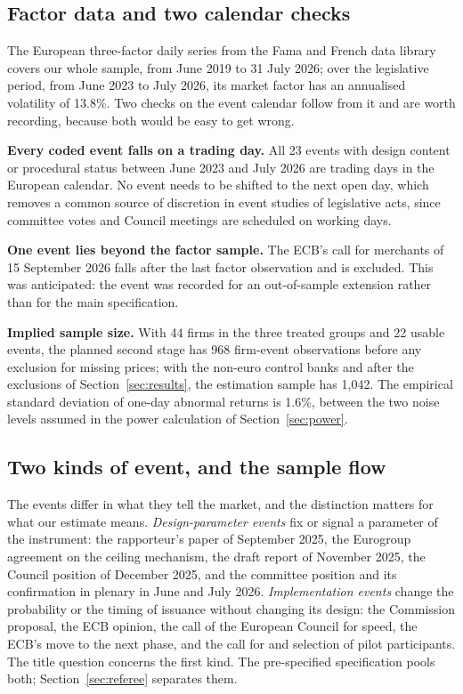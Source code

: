 \documentclass[11pt]{article}
\theoremstyle{plain}\newtheorem{proposition}{Proposition}
\begin{document}
\subsection{Factor data and two calendar checks}

The European three-factor daily series from the Fama and French data library covers our whole sample, from June 2019 to 31 July 2026; over the legislative period, from June 2023 to July 2026, its market factor has an annualised volatility of 13.8\%. Two checks on the event calendar follow from it and are worth recording, because both would be easy to get wrong.

\textbf{Every coded event falls on a trading day.} All 23 events with design content or procedural status between June 2023 and July 2026 are trading days in the European calendar. No event needs to be shifted to the next open day, which removes a common source of discretion in event studies of legislative acts, since committee votes and Council meetings are scheduled on working days.

\textbf{One event lies beyond the factor sample.} The ECB's call for merchants of 15 September 2026 falls after the last factor observation and is excluded. This was anticipated: the event was recorded for an out-of-sample extension rather than for the main specification.

\textbf{Implied sample size.} With 44 firms in the three treated groups and 22 usable events, the planned second stage has 968 firm-event observations before any exclusion for missing prices; with the non-euro control banks and after the exclusions of Section~\ref{sec:results}, the estimation sample has 1,042. The empirical standard deviation of one-day abnormal returns is 1.6\%, between the two noise levels assumed in the power calculation of Section~\ref{sec:power}.

\subsection{Two kinds of event, and the sample flow}\label{sec:flow}

The events differ in what they tell the market, and the distinction matters for what our estimate means. \emph{Design-parameter events} fix or signal a parameter of the instrument: the rapporteur's paper of September 2025, the Eurogroup agreement on the ceiling mechanism, the draft report of November 2025, the Council position of December 2025, and the committee position and its confirmation in plenary in June and July 2026. \emph{Implementation events} change the probability or the timing of issuance without changing its design: the Commission proposal, the ECB opinion, the call of the European Council for speed, the ECB's move to the next phase, and the call for and selection of pilot participants. The title question concerns the first kind. The pre-specified specification pools both; Section~\ref{sec:referee} separates them.
\end{document}
